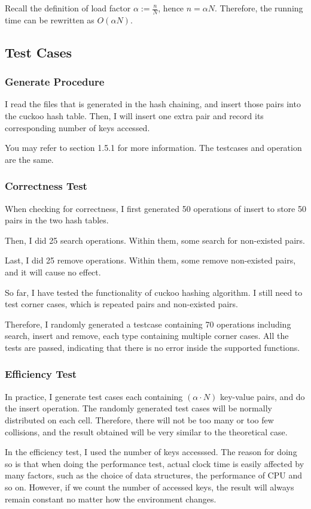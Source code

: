 \documentclass{article}
\begin{document}
\begin{spacing}{1.2}
Recall the definition of load factor $\alpha:=\frac{n}{N}$, hence $n=\alpha N$. Therefore, the running time can be rewritten as $O(\alpha N)$.
\subsection{Test Cases}
\subsubsection{Generate Procedure}
I read the files that is generated in the hash chaining, and insert those pairs into the cuckoo hash table. Then, I will insert one extra pair and record its corresponding number of keys accessed.

You may refer to section 1.5.1 for more information. The testcases and operation are the same.
\subsubsection{Correctness Test}
When checking for correctness, I first generated 50 operations of insert to store 50 pairs in the two hash tables.

Then, I did 25 search operations. Within them, some search for non-existed pairs.

Last, I did 25 remove operations. Within them, some remove non-existed pairs, and it will cause no effect.

So far, I have tested the functionality of cuckoo hashing algorithm. I still need to test corner cases, which is repeated pairs and non-existed pairs.

Therefore, I randomly generated a testcase containing 70 operations including search, insert and remove, each type containing multiple corner cases. All the tests are passed, indicating that there is no error inside the supported functions.

\subsubsection{Efficiency Test}
In practice, I generate test cases each containing $(\alpha\cdot N)$ key-value pairs, and do the insert operation. The randomly generated test cases will be normally distributed on each cell. Therefore, there will not be too many or too few collisions, and the result obtained will be very similar to the theoretical case. 

In the efficiency test, I used the number of keys accesssed. The reason for doing so is that when doing the performance test, actual clock time is easily affected by many factors, such as the choice of data structures, the performance of CPU and so on. However, if we count the number of accessed keys, the result will always remain constant no matter how the environment changes.


\end{spacing}
\end{document}
